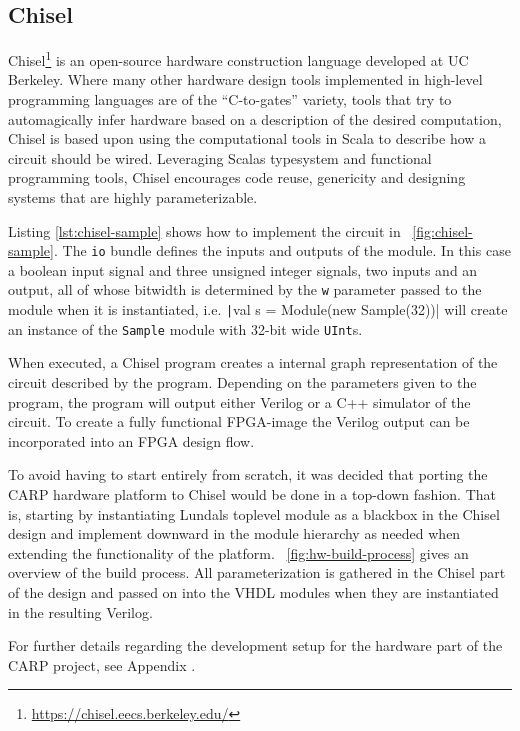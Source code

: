 \subsection{Chisel}
\label{sec:chisel}

Chisel\footnote{\url{https://chisel.eecs.berkeley.edu/}} is an open-source
hardware construction language developed at UC Berkeley. Where many other
hardware design tools implemented in high-level programming languages are of the
``C-to-gates'' variety, tools that try to automagically infer hardware based on
a description of the desired computation, Chisel is based upon using the
computational tools in Scala to describe how a circuit should be wired.
Leveraging Scalas typesystem and functional programming tools, Chisel encourages
code reuse, genericity and designing systems that are highly parameterizable.

Listing \ref{lst:chisel-sample} shows how to implement the circuit in
\figurename~\ref{fig:chisel-sample}. The \texttt{io} bundle defines the inputs
and outputs of the module. In this case a boolean input signal and three
unsigned integer signals, two inputs and an output, all of whose bitwidth is
determined by the \texttt{w} parameter passed to the module when it is
instantiated, i.e. \texttt|val s = Module(new Sample(32))| will
create an instance of the \texttt{Sample} module with 32-bit wide
\texttt{UInt}s.

When executed, a Chisel program creates a internal graph representation of the
circuit described by the program. Depending on the parameters given to the
program, the program will output either Verilog or a C++ simulator of the
circuit. To create a fully functional FPGA-image the Verilog output can be
incorporated into an FPGA design flow.

To avoid having to start entirely from scratch, it was decided that porting the
CARP hardware platform to Chisel would be done in a top-down fashion. That is,
starting by instantiating Lundals toplevel module as a blackbox in the Chisel
design and implement downward in the module hierarchy as needed when extending
the functionality of the platform. \figurename~\ref{fig:hw-build-process} gives
an overview of the build process. All parameterization is gathered in the Chisel
part of the design and passed on into the VHDL modules when they are
instantiated in the resulting Verilog.

For further details regarding the development setup for the hardware part of the
CARP project, see Appendix .

